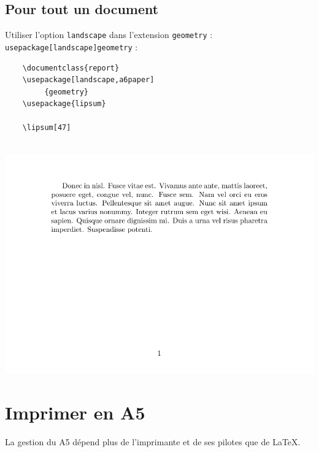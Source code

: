 \subsection{Pour tout un document}

Utiliser l'option \texttt{landscape} dans l'extension \texttt{geometry} : \texttt{usepackage[landscape]geometry} :

\vspace{1em}
\begin{minipage}{.48\linewidth}
	\begin{verbatim}
    \documentclass{report}
    \usepackage[landscape,a6paper]
         {geometry}
    \usepackage{lipsum}
    
    \lipsum[47]
    
	\end{verbatim}
\end{minipage}
\begin{boxedminipage}{.48\linewidth}
	\includegraphics[width=\linewidth]{images/choix_extensions_exemple_landscape}
\end{boxedminipage}





\newpage





\section{Imprimer en A5}

La gestion du A5 dépend plus de l'imprimante et de ses pilotes que de \LaTeX.

